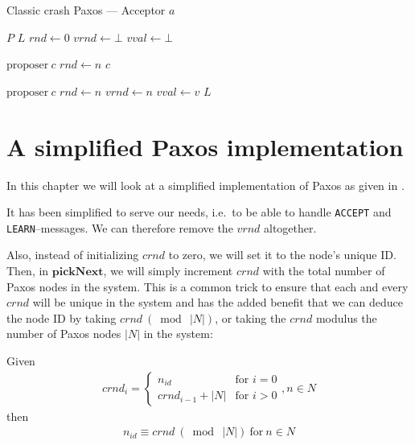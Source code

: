 \begin{algorithm}
  \caption{Classic crash Paxos --- Acceptor $a$}
  \label{algorithm:paxos.full.acceptor}
  \begin{algorithmic}
    \State $P$
    \State $L$
    \State $rnd \gets 0$
    \State $vrnd \gets \bot$
    \State $vval \gets \bot$
    \State

       {$\text{proposer}\ c$}
         \State $rnd \gets n$
         \State {}
                       {$c$}
      \EndIf
    \EndOn
    \State

       {$\text{proposer}\ c$}
        \State $rnd \gets n$
        \State $vrnd \gets n$
        \State $vval \gets v$
        \State {}
                      {$L$}
      \EndIf
    \EndOn
  \end{algorithmic}
\end{algorithm}


\section{A simplified Paxos implementation}

In this chapter we will look at a simplified implementation of Paxos as
given in \cite{Insane.Paxos}.

It has been simplified to serve our needs, i.e.~to be able to handle
\texttt{ACCEPT} and \texttt{LEARN}--messages.  We can therefore remove the
$vrnd$ altogether.


Also, instead of initializing $crnd$ to zero, we will set it to the node's
unique ID.  Then, in $\textbf{pickNext}$, we will simply increment $crnd$
with the total number of Paxos nodes in the system.  This is a common trick
to ensure that each and every $crnd$ will be unique in the system and has
the added benefit that we can deduce the node ID by taking
$crnd\ (\bmod\ |N|)$, or taking the $crnd$ modulus the number of Paxos nodes
$|N|$ in the system:

Given
\begin{gather}
  crnd_i = \left\{
             \begin{array}{ll}
               n_{id} & \mbox{for } i = 0 \\
               crnd_{i-1} + |N| & \mbox{for } i > 0
             \end{array}
           \right., n \in N
\end{gather}
then
\begin{gather}
  n_{id} \equiv crnd\ (\bmod\ |N|)\ \text{for}\ n \in N
  \label{equation:crnd_mod_N}
\end{gather}

